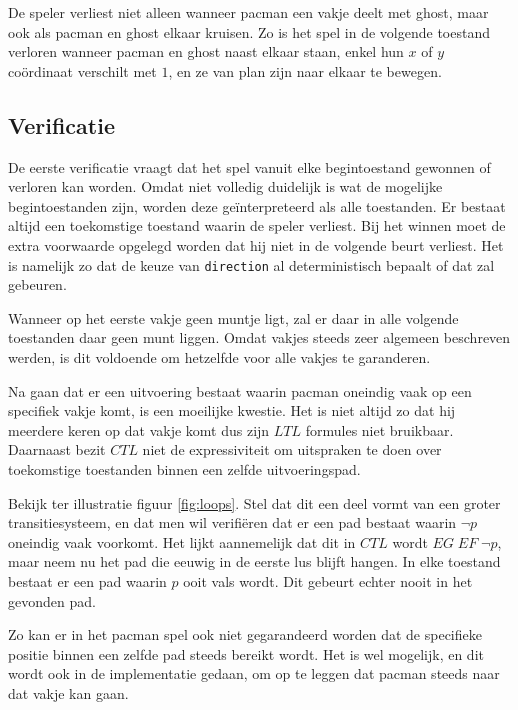 \documentclass[a4paper,12pt]{article}
\begin{document}
De speler verliest niet alleen wanneer pacman een vakje deelt met ghost,
maar ook als pacman en ghost elkaar kruisen.
Zo is het spel in de volgende toestand verloren wanneer pacman en ghost naast elkaar staan,
enkel hun $ x $ of $ y $ co\"ordinaat verschilt met $ 1 $, en ze van plan zijn naar elkaar te bewegen.

\subsection{Verificatie}
De eerste verificatie vraagt dat het spel vanuit elke begintoestand gewonnen of verloren kan worden.
Omdat niet volledig duidelijk is wat de mogelijke begintoestanden zijn,
worden deze ge\"interpreteerd als alle toestanden.
Er bestaat altijd een toekomstige toestand waarin de speler verliest.
Bij het winnen moet de extra voorwaarde opgelegd worden dat hij niet in de volgende beurt verliest.
Het is namelijk zo dat de keuze van \texttt{direction} al deterministisch bepaalt of dat zal gebeuren.

Wanneer op het eerste vakje geen muntje ligt, zal er daar in alle volgende toestanden daar geen munt liggen.
Omdat vakjes steeds zeer algemeen beschreven werden, is dit voldoende om hetzelfde voor alle vakjes te garanderen.


Na gaan dat er een uitvoering bestaat waarin pacman oneindig vaak op een specifiek vakje komt,
is een moeilijke kwestie.
Het is niet altijd zo dat hij meerdere keren op dat vakje komt dus zijn $ LTL $ formules niet bruikbaar.
Daarnaast bezit $ CTL $ niet de expressiviteit om uitspraken te doen over toekomstige toestanden 
binnen een zelfde uitvoeringspad.

Bekijk ter illustratie figuur \ref{fig:loops}. 
Stel dat dit een deel vormt van een groter transitiesysteem,
en dat men wil verifi\"eren dat er een pad bestaat waarin $ \neg p $ oneindig vaak voorkomt.
Het lijkt aannemelijk dat dit in $ CTL $ wordt $ EG\;EF\; \neg p $,
maar neem nu het pad die eeuwig in de eerste lus blijft hangen.
In elke toestand bestaat er een pad waarin $ p $ ooit vals wordt.
Dit gebeurt echter nooit in het gevonden pad.

Zo kan er in het pacman spel ook niet gegarandeerd worden dat de specifieke positie 
binnen een zelfde pad steeds bereikt wordt.
Het is wel mogelijk, en dit wordt ook in de implementatie gedaan,
om op te leggen dat pacman steeds naar dat vakje kan gaan.
\end{document}
